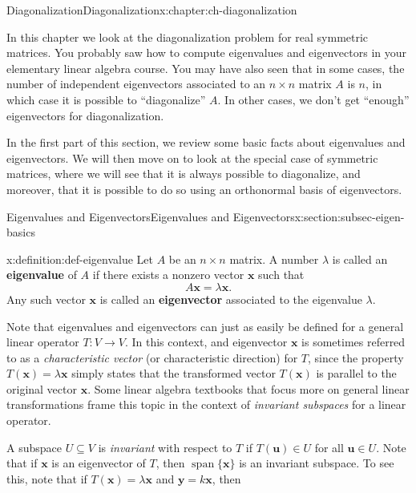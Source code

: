 \documentclass[oneside,10pt,]{book}
\newcommand{\terminology}[1]{\textbf{#1}}
\numberwithin{equation}{section}
\newcommand{\spn}{\operatorname{span}}
\newcommand{\uu}{\mathbf{u}}
\newcommand{\xx}{\mathbf{x}}
\newcommand{\yy}{\mathbf{y}}
\begin{document}
\begin{chapterptx}{Diagonalization}{}{Diagonalization}{}{}{x:chapter:ch-diagonalization}
\begin{introduction}{}%
In this chapter we look at the diagonalization problem for real symmetric matrices. You probably saw how to compute eigenvalues and eigenvectors in your elementary linear algebra course. You may have also seen that in some cases, the number of independent eigenvectors associated to an \(n\times n\) matrix \(A\) is \(n\), in which case it is possible to ``diagonalize'' \(A\). In other cases, we don't get ``enough'' eigenvectors for diagonalization.%
\par
In the first part of this section, we review some basic facts about eigenvalues and eigenvectors. We will then move on to look at the special case of symmetric matrices, where we will see that it is always possible to diagonalize, and moreover, that it is possible to do so using an orthonormal basis of eigenvectors.%
\end{introduction}%
%
%
\typeout{************************************************}
\typeout{************************************************}
%
\begin{sectionptx}{Eigenvalues and Eigenvectors}{}{Eigenvalues and Eigenvectors}{}{}{x:section:subsec-eigen-basics}
\begin{definition}{}{x:definition:def-eigenvalue}%
Let \(A\) be an \(n\times n\) matrix. A number \(\lambda\) is called an \terminology{eigenvalue} of \(A\) if there exists a nonzero vector \(\xx\) such that%
\begin{equation*}
A\xx = \lambda\xx\text{.}
\end{equation*}
Any such vector \(\xx\) is called an \terminology{eigenvector} associated to the eigenvalue \(\lambda\).%
\end{definition}
Note that eigenvalues and eigenvectors can just as easily be defined for a general linear operator \(T:V\to V\). In this context, and eigenvector \(\xx\) is sometimes referred to as a \emph{characteristic vector} (or characteristic direction) for \(T\), since the property \(T(\xx)=\lambda \xx\) simply states that the transformed vector \(T(\xx)\) is parallel to the original vector \(\xx\). Some linear algebra textbooks that focus more on general linear transformations frame this topic in the context of \emph{invariant subspaces} for a linear operator.%
\par
A subspace \(U\subseteq V\) is \emph{invariant} with respect to \(T\) if \(T(\uu)\in U\) for all \(\uu\in U\). Note that if \(\xx\) is an eigenvector of \(T\), then \(\spn\{\xx\}\) is an invariant subspace. To see this, note that if \(T(\xx)=\lambda \xx\) and \(\yy=k\xx\), then%

\end{sectionptx}
\end{chapterptx}
\end{document}
